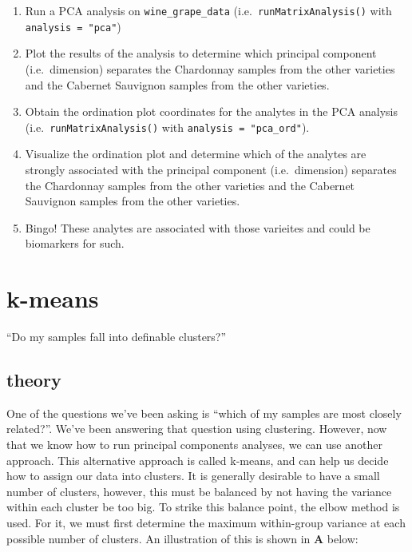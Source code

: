 \documentclass[
]{krantz}
\providecommand{\tightlist}{%
  \setlength{\itemsep}{0pt}\setlength{\parskip}{0pt}}
\begin{document}
\begin{enumerate}
\def\labelenumi{\arabic{enumi}.}
\tightlist
\item
  Run a PCA analysis on \texttt{wine\_grape\_data} (i.e.~\texttt{runMatrixAnalysis()} with \texttt{analysis\ =\ "pca"})
\item
  Plot the results of the analysis to determine which principal component (i.e.~dimension) separates the Chardonnay samples from the other varieties and the Cabernet Sauvignon samples from the other varieties.
\item
  Obtain the ordination plot coordinates for the analytes in the PCA analysis (i.e.~\texttt{runMatrixAnalysis()} with \texttt{analysis\ =\ "pca\_ord"}).
\item
  Visualize the ordination plot and determine which of the analytes are strongly associated with the principal component (i.e.~dimension) separates the Chardonnay samples from the other varieties and the Cabernet Sauvignon samples from the other varieties.
\item
  Bingo! These analytes are associated with those varieites and could be biomarkers for such.
\end{enumerate}

\hypertarget{k-means}{%
\section{k-means}\label{k-means}}

``Do my samples fall into definable clusters?''

\hypertarget{theory-1}{%
\subsection{theory}\label{theory-1}}

One of the questions we've been asking is ``which of my samples are most closely related?''. We've been answering that question using clustering. However, now that we know how to run principal components analyses, we can use another approach. This alternative approach is called k-means, and can help us decide how to assign our data into clusters. It is generally desirable to have a small number of clusters, however, this must be balanced by not having the variance within each cluster be too big. To strike this balance point, the elbow method is used. For it, we must first determine the maximum within-group variance at each possible number of clusters. An illustration of this is shown in \textbf{A} below:
\end{document}

